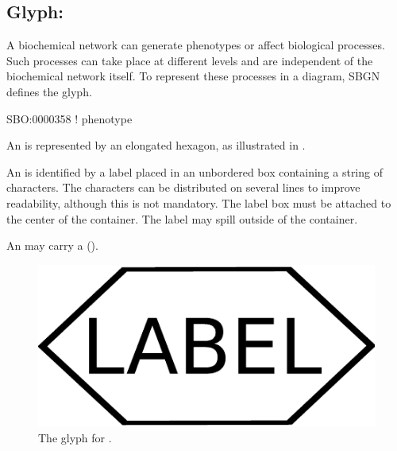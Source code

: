 
\subsection{Glyph: }
\label{sec:phenotype}

A biochemical network can generate phenotypes or affect biological
processes.  Such processes can take place at different levels and are
independent of the biochemical network itself.  To represent these
processes in a diagram, SBGN defines the  glyph.

\begin{glyphDescription}

\glyphSboTerm SBO:0000358 ! phenotype

\glyphContainer An  is represented by an elongated
hexagon, as illustrated in .

\glyphLabel An  is identified by a label placed in an
unbordered box containing a string of characters.  The characters can be
distributed on several lines to improve readability, although this is not
mandatory.  The label box must be attached to the center of the
 container.  The label may spill outside of the container.

\glyphAux An  may carry a 
().

\end{glyphDescription}
 
\begin{figure}[H]
  \centering
  \includegraphics[scale = 0.3]{images/phenotype}
  \caption{The \PD glyph for .}
  \label{fig:phenotype}
\end{figure}

